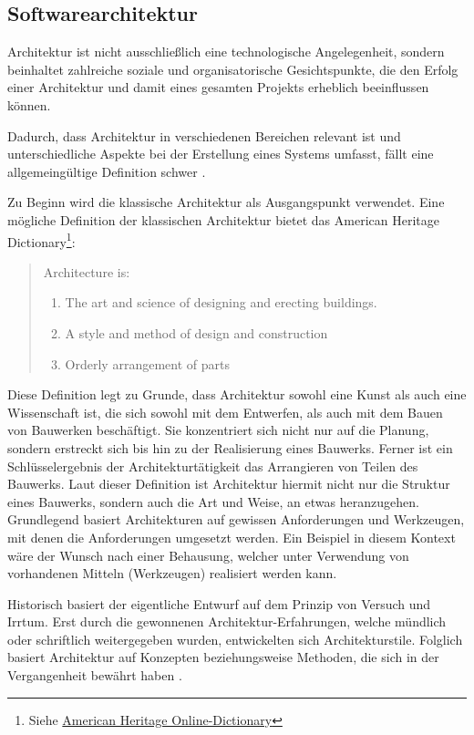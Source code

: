 \subsection{Softwarearchitektur}
\label{sec:2_Softwarearchitektur}

Architektur ist nicht ausschließlich eine technologische Angelegenheit, sondern beinhaltet zahlreiche soziale und organisatorische Gesichtspunkte, die den Erfolg einer Architektur und damit eines gesamten Projekts erheblich beeinflussen können.

Dadurch, dass Architektur in verschiedenen Bereichen relevant ist und unterschiedliche Aspekte bei der Erstellung eines Systems umfasst, fällt eine allgemeingültige Definition schwer \citereset \autocite[siehe][S. 8-11]{Vogel.2009}.

Zu Beginn wird die klassische Architektur als Ausgangspunkt verwendet. Eine mögliche Definition der klassischen Architektur bietet das \glqq American Heritage Dictionary\footnote{Siehe \href{http://ahdictionary.com/word/search.html?q=architecture&submit.x=39&submit.y=20}{American Heritage Online-Dictionary}}\grqq :
\begin{quote}
  Architecture is:
  \begin{enumerate}
    \item The art and science of designing and erecting buildings.
    \item A style and method of design and construction
    \item Orderly arrangement of parts
  \end{enumerate}
\end{quote}

Diese Definition legt zu Grunde, dass Architektur sowohl eine Kunst als auch eine Wissenschaft ist, die sich sowohl mit dem Entwerfen, als auch mit dem Bauen von Bauwerken beschäftigt. Sie konzentriert sich nicht nur auf die Planung, sondern erstreckt sich bis hin zu der Realisierung eines Bauwerks. Ferner ist ein Schlüsselergebnis der Architekturtätigkeit das Arrangieren von Teilen des Bauwerks. Laut dieser Definition ist Architektur hiermit nicht nur die Struktur eines Bauwerks, sondern auch die Art und Weise, an etwas heranzugehen. Grundlegend basiert Architekturen auf gewissen Anforderungen und Werkzeugen, mit denen die Anforderungen umgesetzt werden. Ein Beispiel in diesem Kontext wäre der Wunsch nach einer Behausung, welcher unter Verwendung von vorhandenen Mitteln (Werkzeugen) realisiert werden kann.

Historisch basiert der eigentliche Entwurf auf dem Prinzip von Versuch und Irrtum. Erst durch die gewonnenen Architektur-Erfahrungen, welche mündlich oder schriftlich weitergegeben wurden, entwickelten sich Architekturstile. Folglich basiert Architektur auf Konzepten beziehungsweise Methoden, die sich in der Vergangenheit bewährt haben \citereset \autocite[siehe][S. 41-68]{Vogel.2009}.

